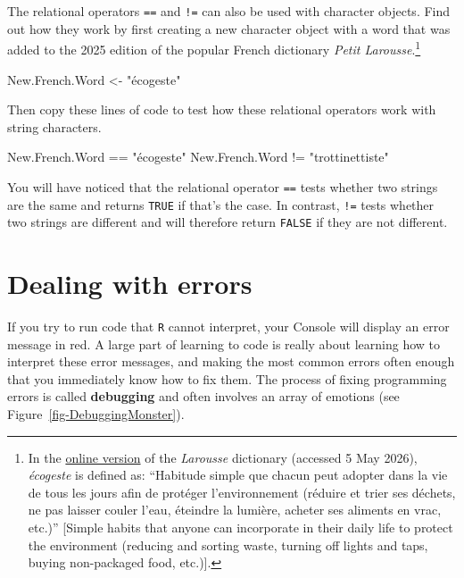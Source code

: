 \documentclass[
  letterpaper,
  DIV=11,
  numbers=noendperiod]{scrreprt}
\newenvironment{Shaded}{\begin{snugshade}}{\end{snugshade}}
\newcommand{\NormalTok}[1]{\textcolor[rgb]{0.00,0.23,0.31}{#1}}
\newcommand{\OtherTok}[1]{\textcolor[rgb]{0.00,0.23,0.31}{#1}}
\newcommand{\SpecialCharTok}[1]{\textcolor[rgb]{0.37,0.37,0.37}{#1}}
\newcommand{\StringTok}[1]{\textcolor[rgb]{0.13,0.47,0.30}{#1}}
\begin{document}
The relational operators \texttt{==} and \texttt{!=} can also be used
with character objects. Find out how they work by first creating a new
character object with a word that was added to the 2025 edition of the
popular French dictionary \emph{Petit Larousse}.\footnote{In the
  \href{https://www.larousse.fr/dictionnaires/francais/\%C3\%A9cogeste/192366}{online
  version} of the \emph{Larousse} dictionary (accessed 5 May 2026),
  \emph{écogeste} is defined as: ``Habitude simple que chacun peut
  adopter dans la vie de tous les jours afin de protéger l'environnement
  (réduire et trier ses déchets, ne pas laisser couler l'eau, éteindre
  la lumière, acheter ses aliments en vrac, etc.)'' {[}Simple habits
  that anyone can incorporate in their daily life to protect the
  environment (reducing and sorting waste, turning off lights and taps,
  buying non-packaged food, etc.){]}.}

\begin{Shaded}
\begin{Highlighting}[]
\NormalTok{New.French.Word }\OtherTok{\textless{}{-}} \StringTok{"écogeste"}
\end{Highlighting}
\end{Shaded}

Then copy these lines of code to test how these relational operators
work with string characters.

\begin{Shaded}
\begin{Highlighting}[]
\NormalTok{New.French.Word }\SpecialCharTok{==} \StringTok{"écogeste"} 
\NormalTok{New.French.Word }\SpecialCharTok{!=} \StringTok{"trottinettiste"}
\end{Highlighting}
\end{Shaded}

You will have noticed that the relational operator \texttt{==} tests
whether two strings are the same and returns \texttt{TRUE} if that's the
case. In contrast, \texttt{!=} tests whether two strings are different
and will therefore return \texttt{FALSE} if they are not different.

\section{\texorpdfstring{Dealing with errors
}{Dealing with errors }}\label{sec-Errors}

If you try to run code that \texttt{R} cannot interpret, your Console
will display an error message in red. A large part of learning to code
is really about learning how to interpret these error messages, and
making the most common errors often enough that you immediately know how
to fix them. The process of fixing programming errors is called
\textbf{debugging} and often involves an array of emotions (see
Figure~\ref{fig-DebuggingMonster}).
\end{document}
